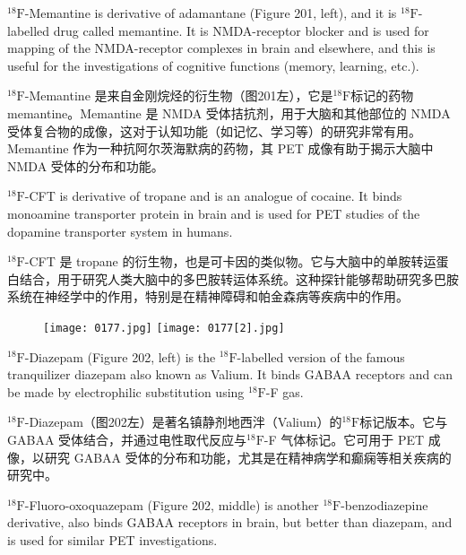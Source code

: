 \documentclass[dvipsnames, svgnames,a4paper,11pt]{article}
\begin{document}
${}^\mathrm{18}\mathrm{F}$-Memantine is derivative of adamantane (Figure 201, left), and it is ${}^\mathrm{18}\mathrm{F}$-labelled
drug called memantine. It is NMDA-receptor blocker and is used for mapping of the
NMDA-receptor complexes in brain and elsewhere, and this is useful for the
investigations of cognitive functions (memory, learning, etc.).

${}^\mathrm{18}\mathrm{F}$-Memantine 是来自金刚烷烃的衍生物（图201左），它是${}^\mathrm{18}\mathrm{F}$标记的药物 memantine。Memantine 是 NMDA 受体拮抗剂，用于大脑和其他部位的 NMDA 受体复合物的成像，这对于认知功能（如记忆、学习等）的研究非常有用。Memantine 作为一种抗阿尔茨海默病的药物，其 PET 成像有助于揭示大脑中 NMDA 受体的分布和功能。

${}^\mathrm{18}\mathrm{F}$-CFT is derivative of tropane and is an analogue of cocaine. It binds monoamine
transporter protein in brain and is used for PET studies of the dopamine transporter
system in humans.

${}^\mathrm{18}\mathrm{F}$-CFT 是 tropane 的衍生物，也是可卡因的类似物。它与大脑中的单胺转运蛋白结合，用于研究人类大脑中的多巴胺转运体系统。这种探针能够帮助研究多巴胺系统在神经学中的作用，特别是在精神障碍和帕金森病等疾病中的作用。

\begin{figure}[h]
	\centering
    \texttt{[image: 0177.jpg]}   
    \texttt{[image: 0177[2].jpg]}   
     \label{fig202}
\end{figure}

${}^\mathrm{18}\mathrm{F}$-Diazepam (Figure 202, left) is the ${}^\mathrm{18}\mathrm{F}$-labelled version of the famous tranquilizer
diazepam also known as Valium. It binds GABAA receptors and can be made by
electrophilic substitution using ${}^\mathrm{18}\mathrm{F}$-F gas.

${}^\mathrm{18}\mathrm{F}$-Diazepam（图202左）是著名镇静剂地西泮（Valium）的${}^\mathrm{18}\mathrm{F}$标记版本。它与 GABAA 受体结合，并通过电性取代反应与${}^\mathrm{18}\mathrm{F}$-F 气体标记。它可用于 PET 成像，以研究 GABAA 受体的分布和功能，尤其是在精神病学和癫痫等相关疾病的研究中。

${}^\mathrm{18}\mathrm{F}$-Fluoro-oxoquazepam (Figure 202, middle) is another ${}^\mathrm{18}\mathrm{F}$-benzodiazepine derivative,
also binds GABAA receptors in brain, but better than diazepam, and is used for
similar PET investigations.
\end{document}

